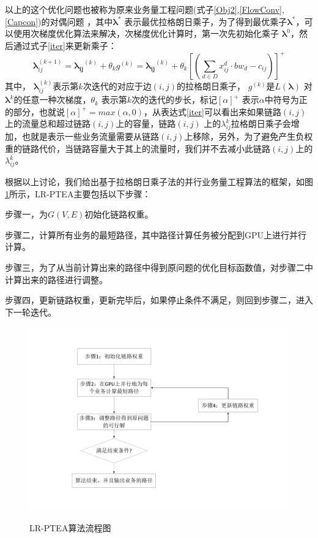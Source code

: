 以上的这个优化问题也被称为原来业务量工程问题(式子\ref{Obj2},\ref{FlowConv},\ref{Capcon})的对偶问题 ，其中$\mathbf{\lambda^*}$ 表示最优拉格朗日乘子，为了得到最优乘子$\mathbf{\lambda^*}$，可以使用次梯度优化算法来解决，次梯度优化计算时，第一次先初始化乘子 $\mathbf{\lambda}^0$，然后通过式子\ref{iter}来更新乘子：
\begin{equation}\label{iter}
\mathbf{\lambda}_{ij}^{(k+1)} =\mathbf{\lambda_{ij}}^{(k)}+\theta_{k} g^{(k)}= \mathbf{\lambda_{ij}}^{(k)} + \theta_k[(\sum\limits_{d \in D}x_{ij}^d\cdot bw_d- c_{ij})]^+
\end{equation}
其中， $\mathbf{\lambda}_{ij}^{(k)}$表示第$k$次迭代的对应于边$(i,j)$的拉格朗日乘子， $g^{(k)}$是$L(\mathbf{\lambda})$ 对$\mathbf{\lambda}^{k}$的任意一种次梯度，$\theta_k$ 表示第$k$次的迭代的步长，标记$[\alpha]^+$ 表示$\alpha$中符号为正的部分，也就说$[\alpha]^+=max(\alpha, 0)$，从表达式\ref{iter}可以看出来如果链路$(i,j)$ 上的流量总和超过链路$(i,j)$上的容量，链路$(i,j)$ 上的$\lambda_{ij}^k$拉格朗日乘子会增加，也就是表示一些业务流量需要从链路$(i,j)$上移除，另外，为了避免产生负权重的链路代价，当链路容量大于其上的流量时，我们并不去减小此链路$(i,j)$上的$\lambda_{ij}^k$。

根据以上讨论，我们给出基于拉格朗日乘子法的并行业务量工程算法的框架，如图\ref{lpl}所示，LR-PTEA主要包括以下步骤：

步骤一，为$G(V, E)$初始化链路权重。

步骤二，计算所有业务的最短路径，其中路径计算任务被分配到GPU上进行并行计算。

步骤三，为了从当前计算出来的路径中得到原问题的优化目标函数值，对步骤二中计算出来的路径进行调整。

步骤四，更新链路权重，更新完毕后，如果停止条件不满足，则回到步骤二，进入下一轮迭代。
\begin{figure}
\vspace{-1cm}
\setlength{\abovecaptionskip}{-0.5cm}
\begin{center}
{\includegraphics[width=1\textwidth]{figures/lagrange.pdf}}
\end{center}
\caption{{\footnotesize{LR-PTEA算法流程图}}}
\label{lpl}
\end{figure}

